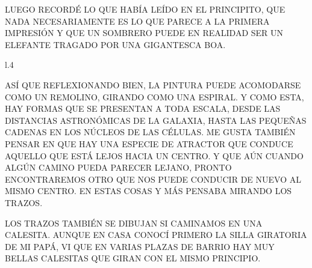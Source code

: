 LUEGO RECORDÉ LO QUE HABÍA LEÍDO EN EL PRINCIPITO, QUE NADA NECESARIAMENTE ES LO QUE PARECE A LA PRIMERA IMPRESIÓN Y QUE UN SOMBRERO PUEDE EN REALIDAD SER UN ELEFANTE TRAGADO POR UNA GIGANTESCA BOA.
\newpage
{}
\begin{wrapfigure}[8]{l}{.4\textwidth}\vspace{-1.2cm}%
\end{wrapfigure}
ASÍ QUE REFLEXIONANDO BIEN, LA PINTURA PUEDE ACOMODARSE COMO UN REMOLINO, GIRANDO COMO UNA ESPIRAL. Y COMO ESTA, HAY FORMAS QUE SE PRESENTAN A TODA ESCALA, DESDE LAS DISTANCIAS ASTRONÓMICAS DE LA GALAXIA, HASTA LAS PEQUEÑAS CADENAS EN LOS NÚCLEOS DE LAS CÉLULAS.
ME GUSTA TAMBIÉN PENSAR EN QUE HAY UNA ESPECIE DE ATRACTOR QUE CONDUCE AQUELLO QUE ESTÁ LEJOS HACIA UN CENTRO. Y QUE AÚN CUANDO ALGÚN CAMINO PUEDA PARECER LEJANO, PRONTO ENCONTRAREMOS OTRO QUE NOS PUEDE CONDUCIR DE NUEVO AL MISMO CENTRO. EN ESTAS COSAS Y MÁS PENSABA MIRANDO LOS TRAZOS.

\newpage
{}
LOS TRAZOS TAMBIÉN SE DIBUJAN SI CAMINAMOS EN UNA CALESITA. AUNQUE EN CASA CONOCÍ PRIMERO LA SILLA GIRATORIA DE MI PAPÁ, VI QUE EN VARIAS PLAZAS DE BARRIO HAY MUY BELLAS CALESITAS QUE GIRAN CON EL MISMO PRINCIPIO.